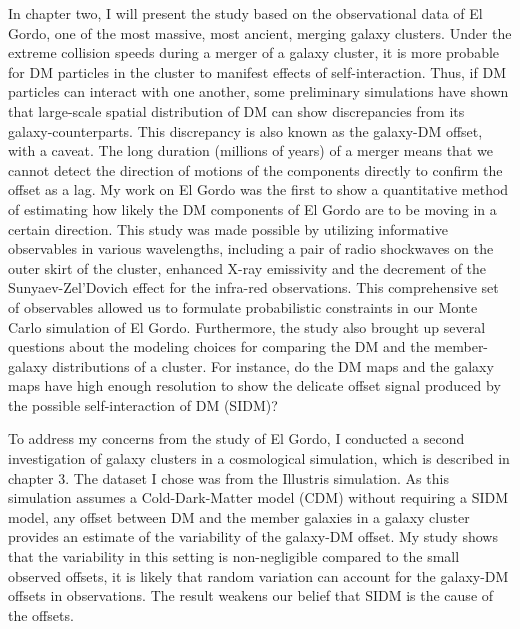 \documentclass[ucdthesis.tex]{subfiles}
\begin{document}
			In chapter two, I will present the study based on the observational data 
			of El Gordo, one of the most massive, most ancient, merging galaxy clusters. 
		Under the extreme collision speeds during a merger of a galaxy cluster, 
		it is more probable for DM particles in the cluster to manifest effects of
		self-interaction. 
		Thus, if DM particles can interact with one another, 		
		some preliminary simulations have shown that large-scale spatial distribution of DM
		can show discrepancies from its galaxy-counterparts. This discrepancy 
		is also known as the galaxy-DM offset, with a caveat. The long duration 
		(millions of years) 
		of a merger means that we cannot detect the
		direction of motions of the components directly to confirm the offset as
		a lag. My work on El Gordo was the first to show a quantitative method of estimating
		how likely the DM components of El Gordo are to be moving in a certain
		direction.	This study was made possible by utilizing informative
		observables in various wavelengths, including a pair of radio shockwaves on
		the outer skirt of the cluster, enhanced X-ray emissivity and the decrement of the
		Sunyaev-Zel'Dovich effect for the infra-red observations.
		This comprehensive set of observables allowed us to formulate 
		probabilistic constraints in our Monte Carlo simulation of El Gordo.
		Furthermore, the study also brought up several questions about the modeling
		choices for comparing the DM and the member-galaxy distributions of a cluster.
		For instance, do the DM maps and the galaxy maps have high enough
		resolution to show the delicate offset signal produced by the possible
		self-interaction of DM (SIDM)?
		
		To address my concerns from the study of El Gordo, 
		I conducted a second investigation of galaxy clusters in a cosmological
		simulation, which is described in chapter 3. The dataset I chose was from 
		the Illustris simulation. As this simulation
		assumes a Cold-Dark-Matter model (CDM) without requiring a SIDM model, 
		any offset between DM and the member galaxies in a 
		galaxy cluster provides an estimate of the variability of the galaxy-DM offset.  My
		study shows that 
		the variability in this setting is non-negligible compared to the
		small observed offsets, it is
		likely that random variation can account for the
		galaxy-DM offsets in observations. The result weakens our belief that SIDM is the
		cause of the offsets. 
\end{document}
